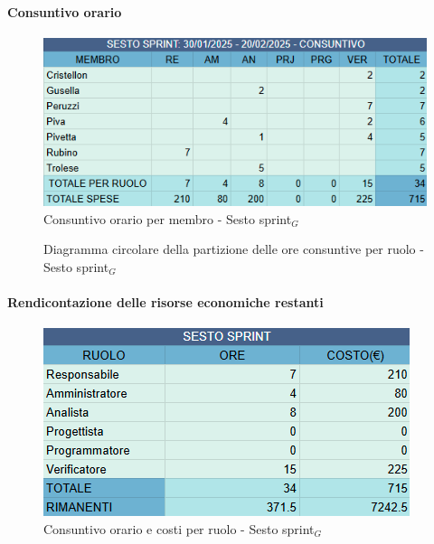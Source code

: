 \documentclass[10pt]{article}
\begin{document}
{{{{{{{    \paragraph{Consuntivo orario}\mbox{}\vspace{0.4em}
    \begin{figure}[ht]
    	\centering
    	\includegraphics[width=0.6\linewidth]{consuntivoOreSestoSprint.png}
    	\caption{Consuntivo orario per membro - Sesto sprint$_G$}
    	\label{fig:Consuntivo orario per membro - Sesto sprint$_G$}
    \end{figure}

    \begin{figure}[H]
        \centering
        \caption{Diagramma circolare della partizione delle ore consuntive per ruolo - Sesto sprint$_G$ }
        \label{fig:Diagramma circolare della partizione delle ore consuntive per ruolo - Sesto sprint$_G$}
    \end{figure}

    \paragraph{Rendicontazione delle risorse economiche restanti}\mbox{}\vspace{0.4em}
    \begin{figure}[H]
    	\centering
    	\includegraphics[width=0.6\linewidth]{oreCostiSestoSprint.png}
    	\caption{Consuntivo orario e costi per ruolo - Sesto sprint$_G$}
    	\label{fig:Consuntivo orario e costi per ruolo - Sesto sprint$_G$}
    \end{figure}
    
}}}}}}}
\end{document}
